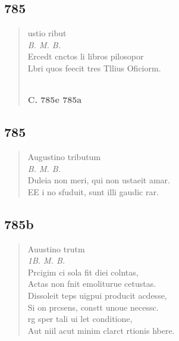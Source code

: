 \documentclass[11pt, a4paper]{report}
\begin{document}
            \subsection*{785}
      \begin{verse}
      ustio ribut \\ \textit{B. M. B.} \\ Ercedt cnctos li libros pilosopor \\ Lbri quos feecit tres Tllius Oficiorm. \\ 
        ﻿\pagebreak 
     \marginpar{[264]} \begin{center} \textbf{C. 785e 785a} \end{center}
      \end{verse}
  
            \subsection*{785}
      \begin{verse}
      Augustino tributum \\ \textit{B. M. B.} \\ Duleia non meri, qui non ustaeit amar. \\ EE i no sfuduit, sunt illi gaudic rar. \\ 
      \end{verse}
  
            \subsection*{785b}
      \begin{verse}
      Auustino trutm \\ \textit{1B. M. B.} \\ Prcigim ci sola fit diei colntas, \\ Actas non fnit emoliturue cetustas. \\ Dissoleit teps uigpui producit acdesse, \\ Si on prcsens, constt unoue necessc. \\ rg sper tali ui let conditione, \\ Aut niil acut minim clarct rtionis hbere. \\ 
      \end{verse}
  
\end{document}
